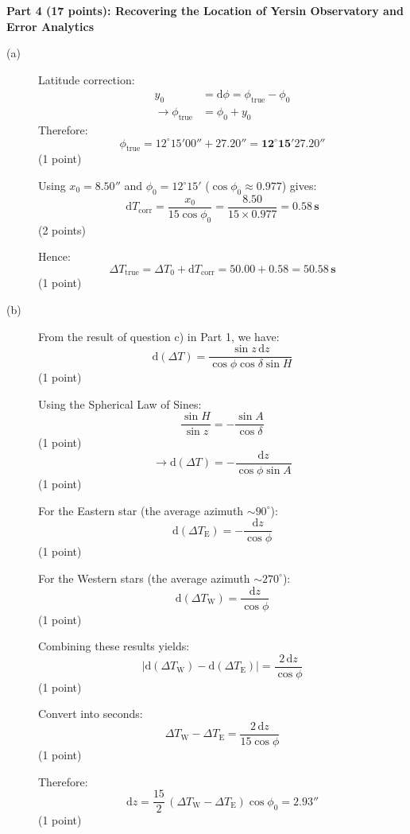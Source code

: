 \medskip\noindent\textbf{Part 4 (17 points): Recovering the Location of Yersin Observatory and Error Analytics}

\begin{description}
\item[(a)] Latitude correction:
  \begin{align*}
    y_0 &= \mathrm{d}\phi = \phi_{\mathrm{true}} - \phi_0 \\
    \rightarrow \phi_{\mathrm{true}} &= \phi_0 + y_0
  \end{align*}
  Therefore:
  \[
  \phi_{\mathrm{true}} = 12^\circ 15' 00'' + 27.20''
  = \mathbf{12^\circ 15' 27.20''}
  \]
  \hfill(1 point)

  Using $x_0 = 8.50''$ and $\phi_0 = 12^\circ 15'$ ($\cos\phi_0 \approx 0.977$)
  gives:
  \[
  \mathrm{d}T_{\mathrm{corr}} = \frac{x_0}{15\cos\phi_0}
  = \frac{8.50}{15 \times 0.977} = \mathbf{0.58\,s}
  \]
  \hfill(2 points)

  Hence:
  \[
  \Delta T_{\mathrm{true}} = \Delta T_0 + \mathrm{d}T_{\mathrm{corr}}
  = 50.00 + 0.58 = \mathbf{50.58\,s}
  \]
  \hfill(1 point)

\item[(b)] From the result of question c) in Part 1, we have:
  \[
  \mathrm{d}(\Delta T) = \frac{\sin z\,\mathrm{d}z}{\cos\phi \cos\delta \sin H}
  \]
  \hfill(1 point)

  Using the Spherical Law of Sines:
  \[
  \frac{\sin H}{\sin z} = -\frac{\sin A}{\cos\delta}
  \]
  \hfill(1 point)
  \[
  \rightarrow \mathrm{d}(\Delta T) = -\frac{\mathrm{d}z}{\cos\phi \sin A}
  \]
  \hfill(1 point)

  For the Eastern star (the average azimuth $\sim 90^\circ$):
  \[
  \mathrm{d}(\Delta T_{\mathrm{E}}) = -\frac{\mathrm{d}z}{\cos\phi}
  \]
  \hfill(1 point)

  For the Western stars (the average azimuth $\sim 270^\circ$):
  \[
  \mathrm{d}(\Delta T_{\mathrm{W}}) = \frac{\mathrm{d}z}{\cos\phi}
  \]
  \hfill(1 point)

  Combining these results yields:
  \[
  \left|\mathrm{d}(\Delta T_{\mathrm{W}}) - \mathrm{d}(\Delta T_{\mathrm{E}})\right|
  = \frac{2\,\mathrm{d}z}{\cos\phi}
  \]
  \hfill(1 point)

  Convert into seconds:
  \[
  \Delta T_{\mathrm{W}} - \Delta T_{\mathrm{E}}
  = \frac{2\,\mathrm{d}z}{15\cos\phi}
  \]
  \hfill(1 point)

  Therefore:
  \[
  \mathrm{d}z = \frac{15}{2}\,(\Delta T_{\mathrm{W}} - \Delta T_{\mathrm{E}})
  \cos\phi_0 = \mathbf{2.93''}
  \]
  \hfill(1 point)


\end{description}
